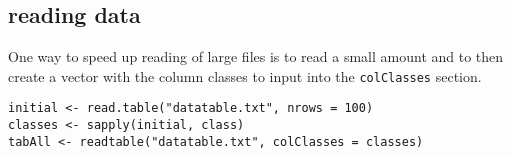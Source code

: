 \documentclass[12pt, a4paper, oneside]{article}\usepackage[]{graphicx}\usepackage[]{color}
\begin{document}
\subsection{reading data}
One way to speed up reading of large files is to read a small amount and to then create a vector with the column classes to input into the \lstinline{colClasses} section. 

\begin{lstlisting}
initial <- read.table("datatable.txt", nrows = 100)
classes <- sapply(initial, class)
tabAll <- readtable("datatable.txt", colClasses = classes)
\end{lstlisting}
\end{document}
